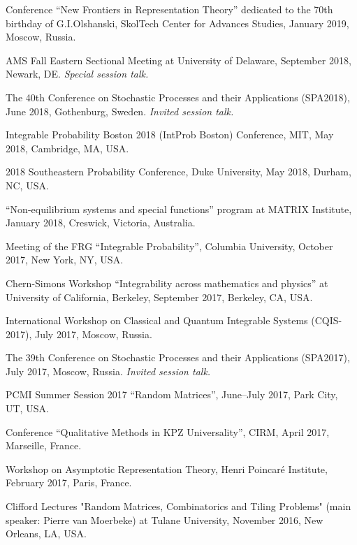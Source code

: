 \documentclass[letterpaper,11pt]{article}
\begin{document}
\begin{etaremune}
	\item Conference ``New Frontiers in Representation Theory'' dedicated to the 70th birthday of G.I.Olshanski, SkolTech Center for Advances Studies, January 2019, Moscow, Russia.
\item AMS Fall Eastern Sectional Meeting
	at University of Delaware,
	September 2018, Newark, DE.
		\emph{Special session talk.}
	\item
    The 40th Conference on Stochastic Processes and their
    Applications (SPA2018), June 2018, 
		Gothenburg, Sweden.
		\emph{Invited session talk.}
	\item
		Integrable Probability Boston 2018 (IntProb Boston)
		Conference, 
		MIT,
		May 2018, 
		Cambridge, MA, USA.
	\item
		2018 Southeastern Probability Conference,
		Duke University, 
		May 2018,
		Durham, NC, USA.
	\item 
		``Non-equilibrium systems and special functions'' program at MATRIX Institute, 
		January 2018, 
		Creswick, Victoria, Australia.
	\item 
		Meeting of the 
		FRG ``Integrable Probability'', Columbia University,
		October 2017, New York, NY, USA.

	\item Chern-Simons Workshop
		``Integrability across mathematics and physics'' 
		 at University of California, Berkeley,
			September 2017, Berkeley, CA, USA.
	\item
	      International Workshop on Classical and Quantum Integrable
	      Systems (CQIS-2017), July 2017, Moscow, Russia.
	\item
	      The 39th Conference on Stochastic Processes and their
	      Applications (SPA2017), July 2017, Moscow, Russia.
				\emph{Invited session talk.}

	\item
	      PCMI Summer Session 2017 ``Random Matrices'', June--July 2017,
	      Park City, UT, USA.

	\item
	      Conference ``Qualitative Methods in KPZ Universality'', CIRM,
	      April 2017, Marseille, France.

	\item
	      Workshop on Asymptotic Representation Theory, Henri Poincar\'e
	      Institute, February 2017, Paris, France.

	\item
	      Clifford Lectures "Random Matrices, Combinatorics and Tiling
	      Problems" (main speaker: Pierre van Moerbeke) at Tulane University, November
	      2016, New Orleans, LA, USA.


\end{etaremune}
\end{document}
